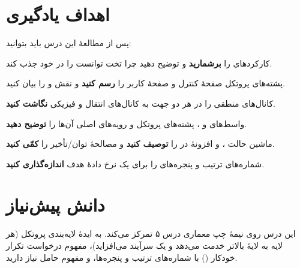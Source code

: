 \documentclass[11pt,a4paper]{article}
\begin{document}
\ACNcover

\section{اهداف یادگیری}
پس از مطالعهٔ این درس باید بتوانید:
\begin{objectives}
  \item کارکردهای  را \textbf{برشمارید} و توضیح دهید چرا  تخت توانست
         را در خود جذب کند.
  \item پشته‌های پروتکل صفحهٔ کنترل و صفحهٔ کاربر  را \textbf{رسم کنید} و نقش
         و  را بیان کنید.
  \item کانال‌های منطقی را در هر دو جهت به کانال‌های انتقال و فیزیکی \textbf{نگاشت کنید}.
  \item واسط‌های  و ، پشته‌های پروتکل و رویه‌های اصلی آن‌ها را \textbf{توضیح دهید}.
  \item ماشین حالت ،  و افزونهٔ  در  را \textbf{توصیف کنید}
        و مصالحهٔ توان/تأخیر  را \textbf{کمّی کنید}.
  \item شماره‌های ترتیب  و پنجره‌های  را برای یک نرخ دادهٔ هدف \textbf{اندازه‌گذاری کنید}.
\end{objectives}

\section{دانش پیش‌نیاز}
این درس روی نیمهٔ چپ معماری  درس ۵ تمرکز می‌کند. به ایدهٔ لایه‌بندی پروتکل (هر لایه به
لایهٔ بالاتر خدمت می‌دهد و یک سرآیند می‌افزاید)، مفهوم درخواست تکرار خودکار () با شماره‌های
ترتیب و پنجره‌ها، و مفهوم حامل  نیاز دارید.
\end{document}
